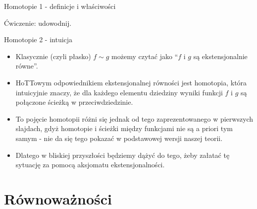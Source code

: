 \documentclass{beamer}
\begin{document}
\begin{frame}{Homotopie 1 - definicje i właściwości}


Ćwiczenie: udowodnij.

\end{frame}

\begin{frame}{Homotopie 2 - intuicja}
\begin{itemize}
	\item Klasycznie (czyli płasko) $f \sim g$ możemy czytać jako ``$f$ i $g$ są ekstensjonalnie równe''.
	\item HoTTowym odpowiednikiem ekstensjonalnej równości jest homotopia, która intuicyjnie znaczy, że dla każdego elementu dziedziny wyniki funkcji $f$ i $g$ są połączone ścieżką w przeciwdziedzinie.
	\item To pojęcie homotopii różni się jednak od tego zaprezentowanego w pierwszych slajdach, gdyż homotopie i ścieżki między funkcjami nie są a priori tym samym - nie da się tego pokazać w podstawowej wersji naszej teorii.
	\item Dlatego w bliskiej przyszłości będziemy dążyć do tego, żeby załatać tę sytuację za pomocą aksjomatu ekstensjonalności.
\end{itemize}
\end{frame}

\section{Równoważności}
\end{document}
